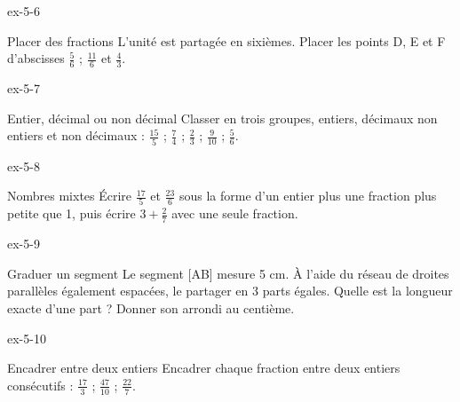 \begin{blocLivre}{ex-5-6}\begin{exercice}[2]{Placer des fractions}
L’unité est partagée en sixièmes. Placer les points D, E et F d’abscisses $\frac56$ ; $\frac{11}6$ et $\frac43$.
\label{fig-ex-5-6}
\end{exercice}\end{blocLivre}
\begin{blocLivre}{ex-5-7}\begin{exercice}[2]{Entier, décimal ou non décimal}
Classer en trois groupes, entiers, décimaux non entiers et non décimaux : $\frac{15}5$ ; $\frac74$ ; $\frac23$ ; $\frac9{10}$ ; $\frac56$.
\end{exercice}\end{blocLivre}
\begin{blocLivre}{ex-5-8}\begin{exercice}[2]{Nombres mixtes}
Écrire $\frac{17}5$ et $\frac{23}6$ sous la forme d’un entier plus une fraction plus petite que 1, puis écrire $3+\frac27$ avec une seule fraction.
\end{exercice}\end{blocLivre}
\begin{blocLivre}{ex-5-9}\begin{exercice}[2]{Graduer un segment}
Le segment [AB] mesure 5 cm. À l’aide du réseau de droites parallèles également espacées, le partager en 3 parts égales. Quelle est la longueur exacte d’une part ? Donner son arrondi au centième.
\label{fig-ex-5-9}
\end{exercice}\end{blocLivre}
\begin{blocLivre}{ex-5-10}\begin{exercice}[2]{Encadrer entre deux entiers}
Encadrer chaque fraction entre deux entiers consécutifs : $\frac{17}3$ ; $\frac{47}{10}$ ; $\frac{22}7$.
\end{exercice}\end{blocLivre}

